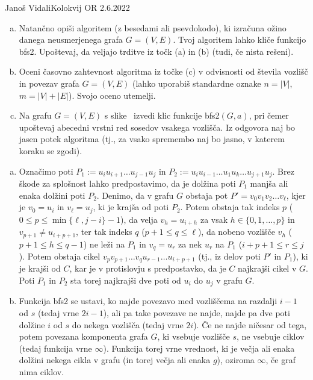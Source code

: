 \begin{naloga}{Janoš Vidali}{Kolokvij OR 2.6.2022}
\begin{vprasanje}
\begin{enumerate}[(a)]
\item Natančno opiši algoritem (z besedami ali psevdokodo),
ki izračuna ožino danega neusmerjenega grafa $G = (V, E)$.
Tvoj algoritem lahko kliče funkcijo {\sc bfs2}.
Upoštevaj, da veljajo trditve iz točk (a) in (b)
(tudi, če nista rešeni).

\item Oceni časovno zahtevnost algoritma iz točke (c)
v odvisnosti od števila vozlišč in povezav grafa $G = (V, E)$
(lahko uporabiš standardne oznake $n = |V|$, $m = |V| + |E|$).
Svojo oceno utemelji.

\item Na grafu $G = (V, E)$ s slike~\fig
izvedi klic funkcije {\sc bfs2}$(G, a)$,
pri čemer upoštevaj abecedni vrstni red sosedov vsakega vozlišča.
Iz odgovora naj bo jasen potek algoritma
(tj., za vsako spremembo naj bo jasno, v katerem koraku se zgodi).
\end{enumerate}

\begin{slika}
\pgfslika
{}
\end{slika}
\end{vprasanje}

\begin{odgovor}
\begin{enumerate}[(a)]
\item Označimo poti $P_1 := u_i u_{i+1} \dots u_{j-1} u_j$
in $P_2 := u_i u_{i-1} \dots u_1 u_k \dots u_{j+1} u_j$.
Brez škode za splošnost lahko predpostavimo, da je dolžina poti $P_1$
manjša ali enaka dolžini poti $P_2$.
Denimo, da v grafu $G$ obstaja pot $P' = v_0 v_1 v_2 \dots v_\ell$,
kjer je $v_0 = u_i$ in $v_\ell = u_j$, ki je krajša od poti $P_2$.
Potem obstaja tak indeks $p$ ($0 \le p \le \min\{\ell, j-i\} - 1$),
da velja $v_h = u_{i+h}$ za vsak $h \in \{0, 1, \dots, p\}$
in $v_{p+1} \ne u_{i+p+1}$,
ter tak indeks $q$ ($p+1 \le q \le \ell$),
da nobeno vozlišče $v_h$ ($p+1 \le h \le q-1$) ne leži na $P_1$
in $v_q = u_r$ za nek $u_r$ na $P_1$ ($i+p+1 \le r \le j$).
Potem obstaja cikel $v_p v_{p+1} \dots v_q u_{r-1} \dots u_{i+p+1}$
(tj., iz delov poti $P'$ in $P_1$),
ki je krajši od $C$,
kar je v protislovju s predpostavko, da je $C$ najkrajši cikel v $G$.
Poti $P_1$ in $P_2$ sta torej najkrajši dve poti od $u_i$ do $u_j$ v grafu $G$.

\item Funkcija {\sc bfs2} se ustavi,
ko najde povezavo med vozliščema na razdalji $i-1$ od $s$ (tedaj vrne $2i-1$),
ali pa take povezave ne najde,
najde pa dve poti dolžine $i$ od $s$ do nekega vozlišča (tedaj vrne $2i$).
Če ne najde ničesar od tega,
potem povezana komponenta grafa $G$, ki vsebuje vozlišče $s$,
ne vsebuje ciklov (tedaj funkcija vrne $\infty$).
Funkcija torej vrne vrednost,
ki je večja ali enaka dolžini nekega cikla v grafu
(in torej večja ali enaka $g$),
oziroma $\infty$, če graf nima ciklov.


\end{enumerate}
\end{odgovor}
\end{naloga}
